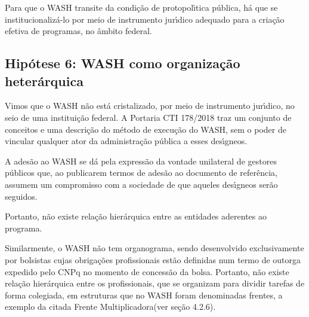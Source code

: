 \documentclass[
12pt,		%
openright,	%
twoside,  %
a4paper,			%
chapter=TITLE,		%
english,			%
french,				%
spanish,			%
brazil				%
]{USPSC-classe/USPSC}
\begin{document}
Para que o WASH transite da condi\c{c}\~ao de protopol\'{\i}tica p\'ublica, h\'a que se institucionaliz\'a-lo por meio de instrumento jur\'{\i}dico adequado para a cria\c{c}\~ao efetiva de programas, no \^ambito federal.








\subsection[Hip\'otese 6: WASH como organiza\c{c}\~ao heter\'arquica]{Hip\'otese 6: WASH como organiza\c{c}\~ao heter\'arquica}\label{Hip\'otese 6: WASH como organiza\c{c}\~ao heter\'arquica}
Vimos que o WASH n\~ao est\'a cristalizado, por meio de instrumento jur\'{\i}dico, no seio de uma institui\c{c}\~ao federal. A Portaria CTI 178/2018 traz um conjunto de conceitos e uma descri\c{c}\~ao do m\'etodo de execu\c{c}\~ao do WASH, sem o poder de vincular qualquer ator da administra\c{c}\~ao p\'ublica a esses des\'{\i}gneos.








A ades\~ao ao WASH se d\'a pela express\~ao da vontade unilateral de gestores p\'ublicos que, ao publicarem termos de ades\~ao ao documento de refer\^encia, assumem um compromisso com a sociedade de que aqueles des\'{\i}gneos ser\~ao seguidos.








Portanto, n\~ao existe rela\c{c}\~ao hier\'arquica entre as entidades aderentes ao \textquotedbl programa\textquotedbl .








Similarmente, o WASH n\~ao tem organograma, sendo desenvolvido exclusivamente por bolsistas cujas obriga\c{c}\~oes profissionais est\~ao definidas num termo de outorga expedido pelo CNPq no momento de concess\~ao da bolsa. Portanto, n\~ao existe rela\c{c}\~ao hier\'arquica entre os profissionais, que se organizam para dividir tarefas de forma colegiada, em estruturas que no WASH foram denominadas \textquotedbl frentes\textquotedbl , a exemplo da citada \textquotedbl Frente Multiplicadora\textquotedbl  (ver se\c{c}\~ao 4.2.6).
\end{document}
